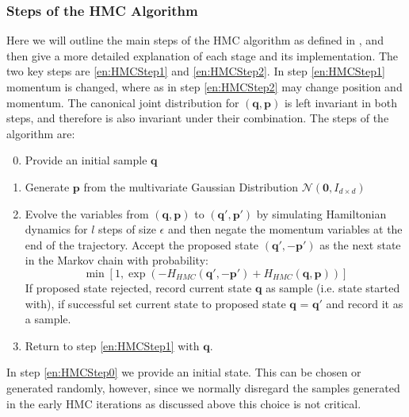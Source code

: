 \documentclass[12pt]{article}
\begin{document}
            \subsubsection{Steps of the HMC Algorithm}
            Here we will outline the main steps of the HMC algorithm as defined in \cite{duane_kennedy_pendleton_roweth_1987}, \cite{kennedy_pendleton_2001} and \cite{neal_2011} then give a more detailed explanation of each stage and its implementation. The two key steps are \ref{en:HMCStep1} and \ref{en:HMCStep2}. In step \ref{en:HMCStep1} momentum is changed, where as in step \ref{en:HMCStep2} may change position and momentum. The canonical joint distribution for $\left(\bm{q},\bm{p}\right)$ is left invariant in both steps, and therefore is also invariant under their combination. The steps of the algorithm are:
            \begin{enumerate}
                \setcounter{enumi}{-1}
                \item \label{en:HMCStep0} Provide an initial sample $\bm{q}$
                \item \label{en:HMCStep1} Generate $\bm{p}$ from the multivariate Gaussian Distribution $\mathcal{N}\left(\bm{0},I_{d\times d}\right)$ 
                \item \label{en:HMCStep2} Evolve the variables from $\left(\bm{q},\bm{p}\right)$ to $\left(\bm{q}',\bm{p}'\right)$ by simulating Hamiltonian dynamics for $l$ steps of size $\epsilon$ and then negate the momentum variables at the end of the trajectory. Accept the proposed state $\left(\bm{q}',-\bm{p}'\right)$ as the next state in the Markov chain with probability:
                        \begin{equation*}
                            \min{\left[1,\exp{\left(-H_{HMC}\left(\bm{q}',-\bm{p}'\right)+ \allowbreak H_{HMC}\left(\bm{q},\bm{p}\right)\right)}\right]}
                        \end{equation*}
                        If proposed state rejected, record current state $\bm{q}$ as sample (i.e. state started with), if successful set current state to proposed state $\bm{q}$ = $\bm{q}'$ and record it as a sample.
                \item \label{en:HMCStep5} Return to step \ref{en:HMCStep1} with $\bm{q}$.
            \end{enumerate}

            In step \ref{en:HMCStep0} we provide an initial state. This can be chosen or generated randomly, however, since we normally disregard the samples generated in the early HMC iterations as discussed above this choice is not critical. 
\end{document}
